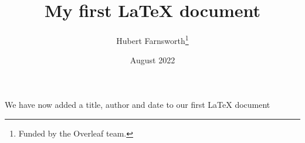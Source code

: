 \documentclass[12pt, letterpaper]{article}
\title{My first LaTeX document}
\author{Hubert Farnsworth\thanks{Funded by the Overleaf team.}}
\date{August 2022}
\begin{document}
\maketitle
We have now added a title, author and date to our first \LaTeX{} document

\end{document}
